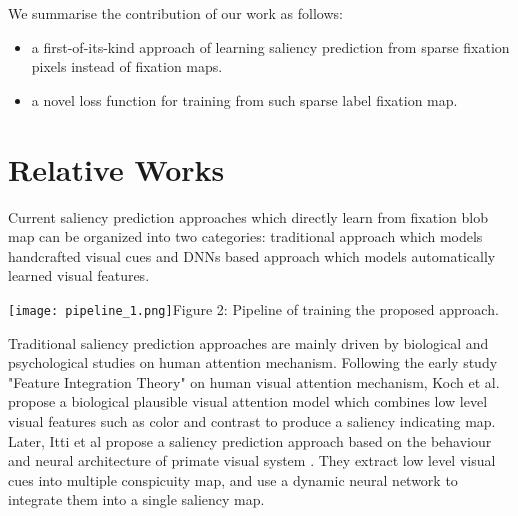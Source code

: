 \documentclass[letterpaper, 10 pt, conference]{ieeeconf}  %
\begin{document}
\par We summarise the contribution of our work as follows:

\begin{itemize}
\item a first-of-its-kind approach of learning saliency prediction from sparse fixation pixels instead of fixation maps.

\item a novel loss function for training from such sparse label fixation map.
\end{itemize}

\section{Relative Works}

\par Current saliency prediction approaches which directly learn from fixation blob map can be organized into two categories: traditional approach which models handcrafted visual cues and DNNs based approach which models automatically learned visual features.

\begin{figure*}[!t]
\centering
    \texttt{[image: pipeline\_1.png]}{Figure 2: Pipeline of training the proposed approach.\label{fig2}}
\end{figure*}

\par Traditional saliency prediction approaches are mainly driven by biological and psychological studies on human attention mechanism. Following the early study "Feature Integration Theory" \cite{b8} on human visual attention mechanism, Koch et al. propose a biological plausible visual attention model \cite{b9} which combines low level visual features such as color and contrast to produce a saliency indicating map. Later, Itti et al propose a saliency prediction approach based on the behaviour and neural architecture of primate visual system \cite{b10}. They extract low level visual cues into multiple conspicuity map, and use a dynamic neural network to integrate them into a single saliency map.
\end{document}
